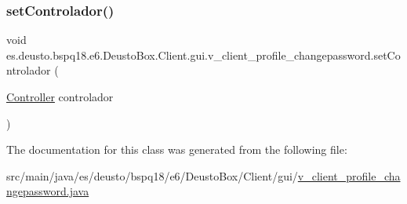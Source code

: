 \subsubsection{\texorpdfstring{set\+Controlador()}{setControlador()}}
{\footnotesize\ttfamily void es.\+deusto.\+bspq18.\+e6.\+Deusto\+Box.\+Client.\+gui.\+v\+\_\+client\+\_\+profile\+\_\+changepassword.\+set\+Controlador (\begin{DoxyParamCaption}\item[{\mbox{\hyperlink{classes_1_1deusto_1_1bspq18_1_1e6_1_1_deusto_box_1_1_client_1_1controller_1_1_controller}{Controller}}}]{controlador }\end{DoxyParamCaption})}



The documentation for this class was generated from the following file\+:\begin{DoxyCompactItemize}
\item 
src/main/java/es/deusto/bspq18/e6/\+Deusto\+Box/\+Client/gui/\mbox{\hyperlink{v__client__profile__changepassword_8java}{v\+\_\+client\+\_\+profile\+\_\+changepassword.\+java}}\end{DoxyCompactItemize}
